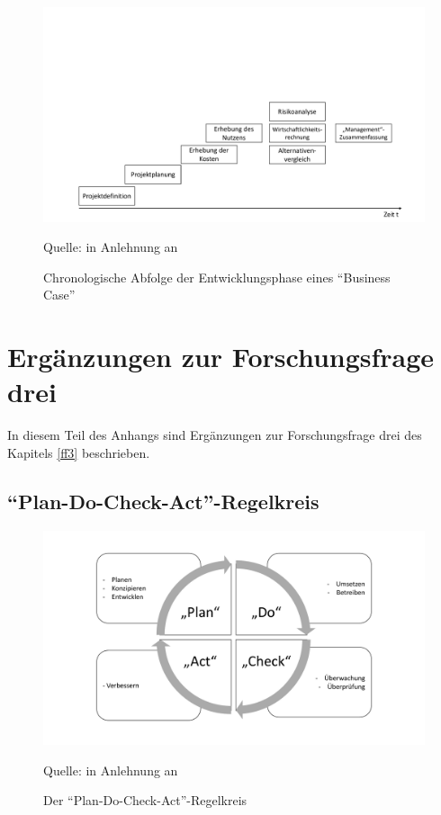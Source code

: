 \begin{figure}[H]
	\centering
	\includegraphics[scale=0.48]{img/chronoBC.pdf}
	\caption{Chronologische Abfolge der Entwicklungsphase eines \enquote{Business Case}}
	{\footnotesize Quelle: in Anlehnung an \cite[][]{herman_is_2009}}
	\label{abb:entwicklungBC}
\end{figure}

\chapter{Ergänzungen zur Forschungsfrage drei} \label{appendixFF3}
In diesem Teil des Anhangs sind Ergänzungen zur Forschungsfrage drei des Kapitels \vref{ff3} beschrieben.

\section{\enquote{Plan-Do-Check-Act}-Regelkreis}

\begin{figure}[H]
	\centering
	\includegraphics[scale=0.51]{img/planDoCheckAct.pdf}
	\caption{Der \enquote{Plan-Do-Check-Act}-Regelkreis}
	{\footnotesize Quelle: in Anlehnung an \cite[][S.\,12]{kersten_it-sicherheitsmanagement_2020}}
	\label{abb:planDoCheckAct}
\end{figure}

